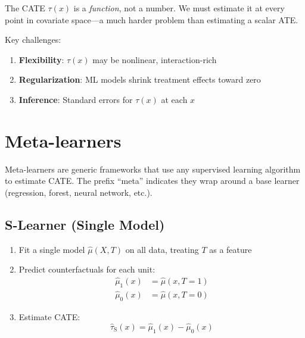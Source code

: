 The CATE $\tau(x)$ is a \emph{function}, not a number. We must estimate it at every point in covariate space---a much harder problem than estimating a scalar ATE.

Key challenges:
\begin{enumerate}
    \item \textbf{Flexibility}: $\tau(x)$ may be nonlinear, interaction-rich
    \item \textbf{Regularization}: ML models shrink treatment effects toward zero
    \item \textbf{Inference}: Standard errors for $\tau(x)$ at each $x$
\end{enumerate}

\section{Meta-learners}
\label{sec:metalearners}

Meta-learners are generic frameworks that use any supervised learning algorithm to estimate CATE. The prefix ``meta'' indicates they wrap around a base learner (regression, forest, neural network, etc.).

\subsection{S-Learner (Single Model)}

\begin{definition}[S-Learner]
\begin{enumerate}
    \item Fit a single model $\hat{\mu}(X, T)$ on all data, treating $T$ as a feature
    \item Predict counterfactuals for each unit:
    \begin{align}
    \hat{\mu}_1(x) &= \hat{\mu}(x, T=1) \\
    \hat{\mu}_0(x) &= \hat{\mu}(x, T=0)
    \end{align}
    \item Estimate CATE:
    \begin{equation}
    \hat{\tau}_{\text{S}}(x) = \hat{\mu}_1(x) - \hat{\mu}_0(x)
    \end{equation}
\end{enumerate}
\end{definition}

